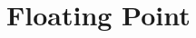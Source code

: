 \documentclass[12pt,a4paper,oneside]{article}
\begin{document}
\section{Floating Point}
\end{document}
